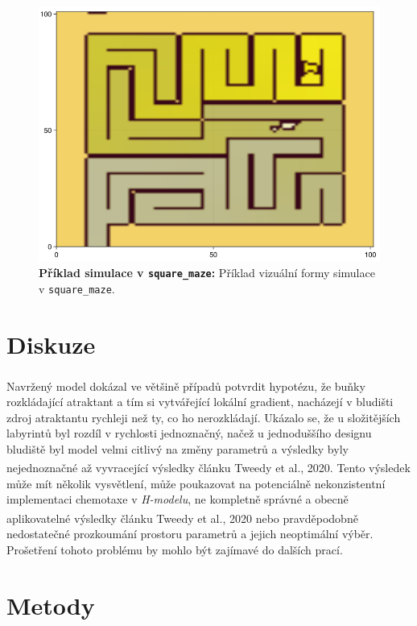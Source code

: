 \documentclass[10pt,a4paper,twocolumn]{article}
\begin{document}
\begin{figure}[tb]
  \centering
  \includegraphics[width=0.98\linewidth]{images/square_visual.png}
  \caption{\textbf{Příklad simulace v \texttt{square\_maze}:} 
  Příklad vizuální formy simulace v \texttt{square\_maze}.}
  \label{fig:square_vis}
\end{figure} 


\section{Diskuze}
Navržený model dokázal ve většině případů potvrdit hypotézu\textsuperscript{\cite{tweedy2020}}, že buňky rozkládající atraktant a tím si vytvářející lokální gradient, nacházejí v bludišti zdroj atraktantu rychleji  než ty, co ho nerozkládají. 
Ukázalo se, že u složitějších labyrintů byl rozdíl v rychlosti jednoznačný, načež u jednoduššího designu bludiště byl model velmi citlivý na změny parametrů a výsledky byly nejednoznačné až vyvracející výsledky článku Tweedy et al., 2020\textsuperscript{\cite{tweedy2020}}. Tento výsledek může mít několik vysvětlení, může poukazovat na potenciálně nekonzistentní implementaci chemotaxe v \textit{H-modelu}, ne kompletně správné a obecně aplikovatelné výsledky článku Tweedy et al., 2020\textsuperscript{\cite{tweedy2020}} nebo pravděpodobně nedostatečné prozkoumání prostoru parametrů a jejich neoptimální výběr. Prošetření tohoto problému by mohlo být zajímavé do dalších prací.  

\section{Metody}
\end{document}
